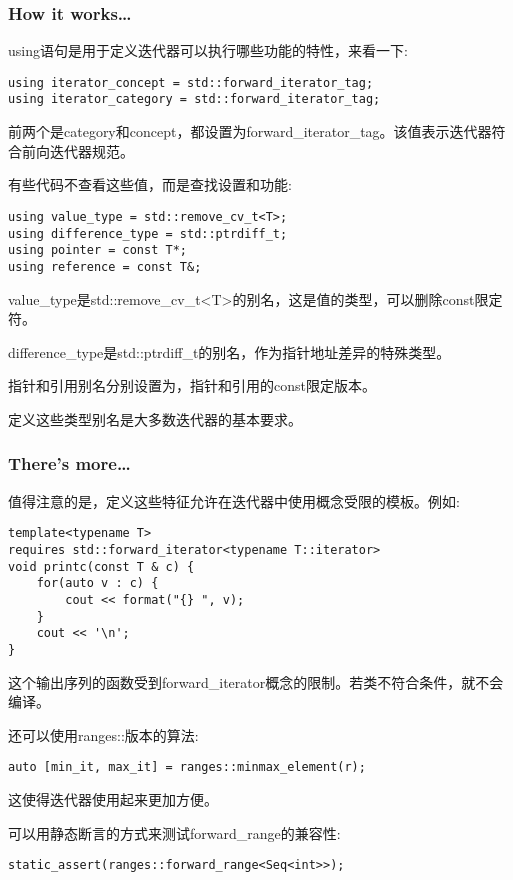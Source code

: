 \subsubsection{How it works…}

using语句是用于定义迭代器可以执行哪些功能的特性，来看一下:

\begin{lstlisting}[style=styleCXX]
using iterator_concept = std::forward_iterator_tag;
using iterator_category = std::forward_iterator_tag;
\end{lstlisting}

前两个是category和concept，都设置为forward\_iterator\_tag。该值表示迭代器符合前向迭代器规范。

有些代码不查看这些值，而是查找设置和功能:

\begin{lstlisting}[style=styleCXX]
using value_type = std::remove_cv_t<T>;
using difference_type = std::ptrdiff_t;
using pointer = const T*;
using reference = const T&;
\end{lstlisting}

value\_type是std::remove\_cv\_t<T>的别名，这是值的类型，可以删除const限定符。

difference\_type是std::ptrdiff\_t的别名，作为指针地址差异的特殊类型。

指针和引用别名分别设置为，指针和引用的const限定版本。

定义这些类型别名是大多数迭代器的基本要求。

\subsubsection{There's more…}

值得注意的是，定义这些特征允许在迭代器中使用概念受限的模板。例如:

\begin{lstlisting}[style=styleCXX]
template<typename T>
requires std::forward_iterator<typename T::iterator>
void printc(const T & c) {
	for(auto v : c) {
		cout << format("{} ", v);
	}
	cout << '\n';
}
\end{lstlisting}

这个输出序列的函数受到forward\_iterator概念的限制。若类不符合条件，就不会编译。

还可以使用ranges::版本的算法:

\begin{lstlisting}[style=styleCXX]
auto [min_it, max_it] = ranges::minmax_element(r);
\end{lstlisting}

这使得迭代器使用起来更加方便。

可以用静态断言的方式来测试forward\_range的兼容性:

\begin{lstlisting}[style=styleCXX]
static_assert(ranges::forward_range<Seq<int>>);
\end{lstlisting}









